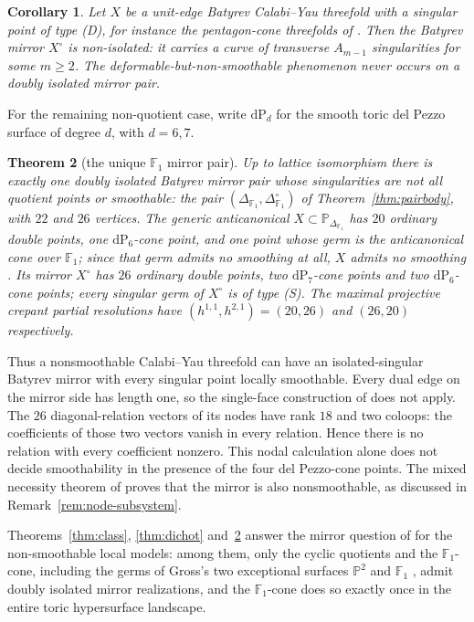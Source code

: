 \documentclass[11pt]{amsart}
\newtheorem{theorem}{Theorem}[section]
\newtheorem{corollary}[theorem]{Corollary}
\theoremstyle{definition}
\theoremstyle{remark}
\newcommand{\PP}{\mathbb{P}}
\newcommand{\FF}{\mathbb{F}}
\begin{document}
\begin{corollary}\label{cor:defonly}
Let $X$ be a unit-edge Batyrev
Calabi--Yau threefold with a singular point of
type \textup{(D)}, for instance the pentagon-cone threefolds of
\cite[Thms.~5.3, 5.8]{paper1}.  Then the Batyrev mirror $X^\circ$ is
non-isolated: it carries a curve of transverse $A_{m-1}$ singularities for
some $m \ge 2$.  The
deformable-but-non-smoothable phenomenon never occurs on a doubly isolated
mirror pair.
\end{corollary}

For the remaining non-quotient case, write $\mathrm{dP}_d$ for the smooth
toric del Pezzo surface of degree $d$, with $d=6,7$.

\begin{theorem}[the unique $\FF_1$ mirror pair]\label{thm:pair}
Up to lattice isomorphism there is exactly
one doubly isolated Batyrev mirror
pair whose singularities are not all quotient points or smoothable: the pair
$(\Delta_{\FF_1}, \Delta_{\FF_1}^\circ)$ of Theorem~\textup{\ref{thm:pairbody}},
with $22$ and $26$ vertices.  The generic anticanonical
$X \subset \PP_{\Delta_{\FF_1}}$ has $20$ ordinary double points, one
$\mathrm{dP}_6$-cone point, and one point whose germ is the anticanonical
cone over $\FF_1$; since that germ admits no smoothing at all, $X$
\emph{admits no smoothing} \cite[Cor.~4.3]{paper1}.  Its mirror $X^\circ$
has $26$ ordinary double
points, two $\mathrm{dP}_7$-cone points and two $\mathrm{dP}_6$-cone
points; every singular germ of $X^\circ$ is of type \textup{(S)}.  The maximal
projective crepant partial resolutions have
$(h^{1,1},h^{2,1}) = (20,26)$ and $(26,20)$ respectively.
\end{theorem}

Thus a nonsmoothable Calabi--Yau threefold can have an isolated-singular
Batyrev mirror with every singular point locally smoothable.  Every dual
edge on the mirror side has length one, so the single-face construction
of \cite{paper2} does not apply.  The $26$ diagonal-relation vectors
of its nodes have rank $18$ and two coloops: the coefficients of those
two vectors vanish in every relation.  Hence there is no relation with
every coefficient nonzero.  This nodal calculation alone does not
decide smoothability in the presence of the four del Pezzo-cone points.
The mixed necessity theorem of \cite{paper4} proves that the mirror is
also nonsmoothable, as discussed in
Remark~\ref{rem:node-subsystem}.

Theorems~\ref{thm:class}, \ref{thm:dichot} and~\ref{thm:pair} answer the
mirror question of
\cite[\S6.4]{paper1} for the non-smoothable local models: among them,
only the cyclic quotients and the $\FF_1$-cone,
including the germs of Gross's two exceptional surfaces $\PP^2$ and
$\FF_1$ \cite[Thm.~5.8]{Gross97}, admit doubly isolated mirror
realizations, and the $\FF_1$-cone does so exactly once in the entire toric
hypersurface landscape.
\end{document}
